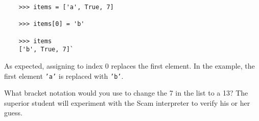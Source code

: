 \color{CodeGreen}
\begin{codesize}
\begin{verbatim}
    >>> items = ['a', True, 7]

    >>> items[0] = 'b'

    >>> items
    ['b', True, 7]`
\end{verbatim}
\end{codesize}
\color{black}

As expected, assigning to index 0 replaces the first element. In
the example, the first element {\tt\codesize 'a'}
is replaced with {\tt\codesize 'b'}.

What bracket notation would you use to change the 7 in the list
to a 13? The superior student will experiment with the Scam
interpreter to verify his or her guess.
